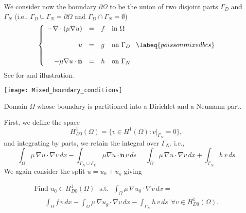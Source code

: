 We consider now the boundary $\partial{\Omega}$ to be the union of
two disjoint parts $\Gamma_D$ and $\Gamma_N$ (i.e., $\Gamma_D \cup \Gamma_N = \partial{\Omega}$
and $\Gamma_D \cap \Gamma_N = \emptyset$)
\begin{equation}
\left\{
\begin{array}{rcll}
-\nabla \cdot \left ( \mu \nabla{u} \right) & = & f & \mbox{in}~\Omega \\
& & & \\
u & = & g & \mbox{on}~\Gamma_D \\
& & & \\
-\mu \nabla{u} \cdot \check{\mathbf{n}} & = & h & \mbox{on}~\Gamma_N
\end{array}
\right.\labeq{poissonmixedbcs}
\end{equation}
See  for and illustration.
\begin{marginfigure}[0.01cm]
	\texttt{[image: Mixed\_boundary\_conditions]}
	\caption[]{Domain $\Omega$ whose boundary is partitioned into a Dirichlet and a Neumann part.} 
\end{marginfigure}
First, we define the space
\begin{equation}
H^1_{D0}(\Omega) = \{v \in H^1(\Omega) : v|_{\Gamma_D} = 0 \}, \nonumber
\end{equation}
and integrating by parts, we retain the integral over $\Gamma_N$, i.e.,
\begin{equation}
\int_{\Omega}{\mu\,\nabla{u}\cdot \nabla{v}}\,dx - \int_{\Gamma_N\cup\Gamma_D}{\mu\nabla{u}\cdot\check{\textbf{n}} \, v} \,ds =
        \int_{\Omega}{\mu\,\nabla{u}\cdot \nabla{v}}\,dx + \int_{\Gamma_N}{h \, v}\,ds
\end{equation}
We again consider the split $u = u_0 + u_g$ giving
\begin{kaobox}[frametitle=Weak form of Poisson's with Mixed data]
\vspace{-0.25cm}
\begin{eqnarray}
\mbox{Find $u_0 \in H^1_{D0}(\Omega)$~~s.t.~~} \int_{\Omega}{\mu\,\nabla{u_0}\cdot \nabla{v}}\,dx =~~~~~~~~~~~~~~~~~~~~~~~~~\nonumber \\
        ~~~~~~~\int_{\Omega}{f\,v} \,dx - \int_{\Omega}{\mu\,\nabla{u_g} \cdot \nabla{v}} \,dx
        - \int_{\Gamma_N}{h \, v} \,ds ~~\forall v \in H^1_{D0}(\Omega). \nonumber
\end{eqnarray}
\end{kaobox}
